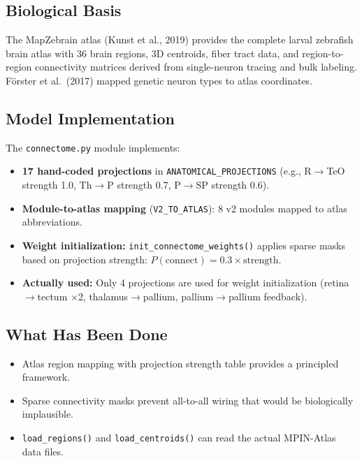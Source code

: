 \documentclass[11pt,a4paper]{article}
\begin{document}
\subsection{Biological Basis}

The MapZebrain atlas (Kunst et al., 2019) provides the complete larval zebrafish
brain atlas with 36 brain regions, 3D centroids, fiber tract data, and region-to-region
connectivity matrices derived from single-neuron tracing and bulk labeling.
F\"{o}rster et al.\ (2017) mapped genetic neuron types to atlas coordinates.

\subsection{Model Implementation}

The \texttt{connectome.py} module implements:
\begin{itemize}[leftmargin=*]
\item \textbf{17 hand-coded projections} in \texttt{ANATOMICAL\_PROJECTIONS}
  (e.g., R$\to$TeO strength 1.0, Th$\to$P strength 0.7, P$\to$SP strength 0.6).
\item \textbf{Module-to-atlas mapping} (\texttt{V2\_TO\_ATLAS}): 8 v2 modules mapped
  to atlas abbreviations.
\item \textbf{Weight initialization:} \texttt{init\_connectome\_weights()} applies
  sparse masks based on projection strength: $P(\text{connect}) = 0.3 \times \text{strength}$.
\item \textbf{Actually used:} Only 4 projections are used for weight initialization
  (retina$\to$tectum $\times$2, thalamus$\to$pallium, pallium$\to$pallium feedback).
\end{itemize}

\subsection{What Has Been Done}

\begin{itemize}[leftmargin=*]
\item[\textcolor{realistic}{$\checkmark$}] Atlas region mapping with projection
  strength table provides a principled framework.
\item[\textcolor{realistic}{$\checkmark$}] Sparse connectivity masks prevent
  all-to-all wiring that would be biologically implausible.
\item[\textcolor{realistic}{$\checkmark$}] \texttt{load\_regions()} and
  \texttt{load\_centroids()} can read the actual MPIN-Atlas data files.
\end{itemize}
\end{document}
